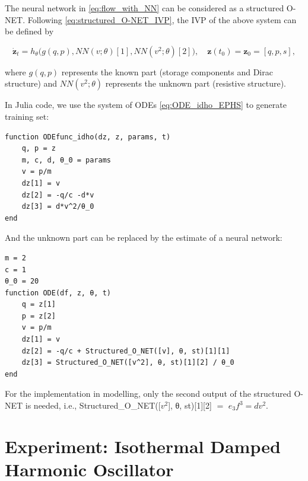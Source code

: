 \documentclass[
	parskip, 			   %
	twoside, 			   %
	DIV=14, 			   %
	BCOR=15.0mm, 		   %
	headsepline, 		   %
	open=right, 		   %
	captions=tableheading, %
	bibliography=totoc,    %
	numbers=noenddot       %
]{scrreprt}
\begin{document}
The neural network in \ref{eq:flow_with_NN} can be considered as a structured O-NET. Following \ref{eq:structured_O-NET_IVP}, the IVP of the above system can be defined by

\begin{equation}
    \label{eq:structured_O-NET_compositional_IVP}
    \dot{\mathbf{z}}_t = h_{\theta} \big(g(q, p), NN(v; \theta)[1], NN(v^2; \theta)[2] \big), \quad \mathbf{z}(t_{0}) = \mathbf{z}_{0} = [q, p, s],
\end{equation}

where $g(q, p)$ represents the known part (storage components and Dirac structure) and $NN(v^2; \theta)$ represents the unknown part (resistive structure).

In Julia code, we use the system of ODEs \ref{eq:ODE_idho_EPHS} to generate training set:

\begin{verbatim}
function ODEfunc_idho(dz, z, params, t)
    q, p = z
    m, c, d, θ_0 = params
    v = p/m
    dz[1] = v
    dz[2] = -q/c -d*v
    dz[3] = d*v^2/θ_0
end
\end{verbatim}

And the unknown part can be replaced by the estimate of a neural network:

\begin{verbatim}
m = 2
c = 1
θ_0 = 20
function ODE(df, z, θ, t)
    q = z[1]
    p = z[2]
    v = p/m
    dz[1] = v
    dz[2] = -q/c + Structured_O_NET([v], θ, st)[1][1]
    dz[3] = Structured_O_NET([v^2], θ, st)[1][2] / θ_0
end
\end{verbatim}

For the implementation in modelling, only the second output of the structured O-NET is needed, i.e., Structured\_O\_NET([$v^2$], θ, st)[1][2] $=$ $e_3 f^3 = dv^2$.

\section{Experiment: Isothermal Damped Harmonic Oscillator}
\end{document}
